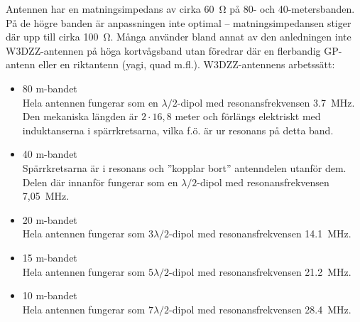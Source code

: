 Antennen har en matningsimpedans av cirka \SI{60}{\ohm} på 80- och
40-metersbanden.
På de högre banden är anpassningen inte optimal -- matningsimpedansen stiger
där upp till cirka \SI{100}{\ohm}.
Många använder bland annat av den anledningen inte W3DZZ-antennen på höga
kortvågsband utan föredrar där en flerbandig GP-antenn eller en riktantenn
(yagi, quad m.fl.).
W3DZZ-antennens arbetssätt:
\begin{itemize}
\item 80 m-bandet \\ Hela antennen fungerar som en \(\lambda/2\)-dipol med
  resonansfrekvensen \SI{3,7}{\mega\hertz}.
  Den mekaniska längden är \(2 \cdot 16,8\) meter och förlängs elektriskt med
  induktanserna i spärrkretsarna, vilka f.ö. är ur resonans på detta band.

\item 40 m-bandet \\ Spärrkretsarna är i resonans och ''kopplar bort''
  antenndelen utanför dem.
  Delen där innanför fungerar som en \(\lambda/2\)-dipol med resonansfrekvensen
  7,05~MHz.

\item 20 m-bandet \\ Hela antennen fungerar som \(3\lambda/2\)-dipol
  med resonansfrekvensen \SI{14,1}{\mega\hertz}.

\item 15 m-bandet \\ Hela antennen fungerar som \(5\lambda/2\)-dipol
  med resonansfrekvensen \SI{21,2}{\mega\hertz}.

\item 10 m-bandet \\ Hela antennen fungerar som \(7\lambda/2\)-dipol
  med resonansfrekvensen \SI{28,4}{\mega\hertz}.
\end{itemize}

